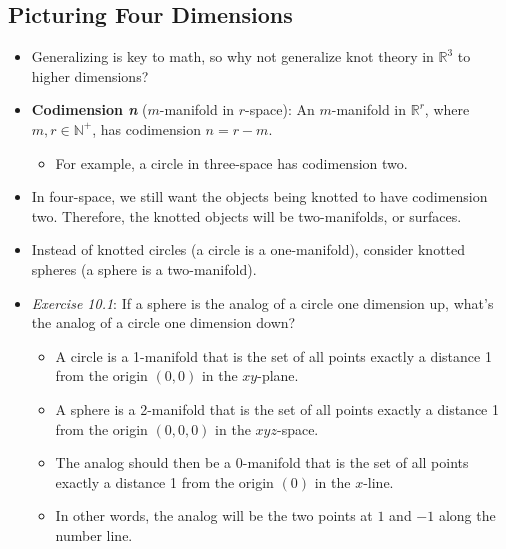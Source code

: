 \documentclass[titlepage]{article}
\numberwithin{figure}{section}
\numberwithin{table}{section}
\numberwithin{equation}{section}
\begin{document}
\subsection{Picturing Four Dimensions}
\begin{itemize}
    \item Generalizing is key to math, so why not generalize knot theory in $\mathbb{R}^3$ to higher dimensions?
    \item \textbf{Codimension \emph{n}} ($m$-manifold in $r$-space): An $m$-manifold in $\mathbb{R}^r$, where $m,r\in\mathbb{N}^+$, has codimension $n=r-m$.
    \begin{itemize}
        \item For example, a circle in three-space has codimension two.
    \end{itemize}
    \item In four-space, we still want the objects being knotted to have codimension two. Therefore, the knotted objects will be two-manifolds, or surfaces.
    \item Instead of knotted circles (a circle is a one-manifold), consider knotted spheres (a sphere is a two-manifold).
    \item \emph{Exercise 10.1}: If a sphere is the analog of a circle one dimension up, what's the analog of a circle one dimension down?
    \begin{itemize}
        \item A circle is a 1-manifold that is the set of all points exactly a distance 1 from the origin $(0,0)$ in the $xy$-plane.
        \item A sphere is a 2-manifold that is the set of all points exactly a distance 1 from the origin $(0,0,0)$ in the $xyz$-space.
        \item The analog should then be a 0-manifold that is the set of all points exactly a distance 1 from the origin $(0)$ in the $x$-line.
        \item In other words, the analog will be the two points at $1$ and $-1$ along the number line.
    \end{itemize}
    \begin{figure}[h!]
        \centering
\end{figure}
\end{itemize}
\end{document}

